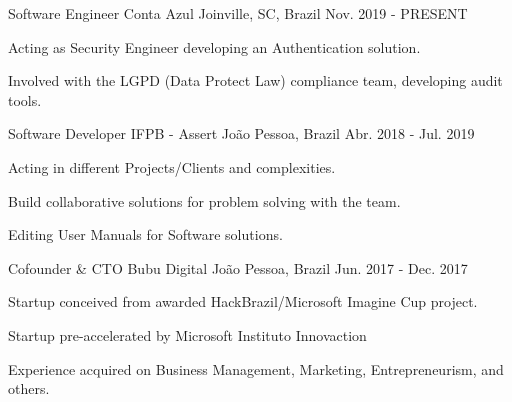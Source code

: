 

\begin{cventries}

  \cventry
    {Software Engineer} %
    {Conta Azul} %
    {Joinville, SC, Brazil} %
    {Nov. 2019 - PRESENT} %
    {
      \begin{cvitems} %
        \item {Acting as Security Engineer developing an Authentication solution.}
        \item {Involved with the LGPD (Data Protect Law) compliance team, developing audit tools.}
      \end{cvitems}
    }
    
  \cventry
    {Software Developer} %
    {IFPB - Assert} %
    {João Pessoa, Brazil} %
    {Abr. 2018 - Jul. 2019} %
    {
      \begin{cvitems} %
        \item {Acting in different Projects/Clients and complexities.}
		\item {Build collaborative solutions for problem solving with the team.}
		\item {Editing User Manuals for Software solutions.}
      \end{cvitems}
    }
    
      \cventry
        {Cofounder \& CTO} %
        {Bubu Digital} %
        {João Pessoa, Brazil} %
        {Jun. 2017 - Dec. 2017} %
        {
          \begin{cvitems} %
            \item {Startup conceived from awarded HackBrazil/Microsoft Imagine Cup project.}
            \item {Startup pre-accelerated by Microsoft Instituto Innovaction}
            \item {Experience acquired on Business Management, Marketing, Entrepreneurism, and others.}
          \end{cvitems}
        }


\end{cventries}
